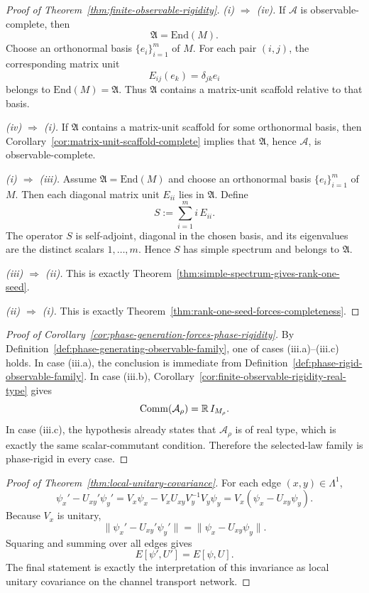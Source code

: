 \begin{proof}[Proof of Theorem~\ref{thm:finite-observable-rigidity}]
\label{proof:thm:finite-observable-rigidity}
\textit{(i) $\Rightarrow$ (iv).}
If $\mathcal A$ is observable-complete, then
\[
\mathfrak A=\mathrm{End}(M).
\]
Choose an orthonormal basis $\{e_i\}_{i=1}^m$ of $M$. For each pair $(i,j)$,
the corresponding matrix unit
\[
E_{ij}(e_k)=\delta_{jk}e_i
\]
belongs to $\mathrm{End}(M)=\mathfrak A$. Thus $\mathfrak A$ contains a
matrix-unit scaffold relative to that basis.

\smallskip\noindent
\textit{(iv) $\Rightarrow$ (i).}
If $\mathfrak A$ contains a matrix-unit scaffold for some orthonormal basis,
then Corollary~\ref{cor:matrix-unit-scaffold-complete} implies that
$\mathfrak A$, hence $\mathcal A$, is observable-complete.

\smallskip\noindent
\textit{(i) $\Rightarrow$ (iii).}
Assume $\mathfrak A=\mathrm{End}(M)$ and choose an orthonormal basis
$\{e_i\}_{i=1}^m$ of $M$. Then each diagonal matrix unit $E_{ii}$ lies in
$\mathfrak A$. Define
\[
S:=\sum_{i=1}^m i\,E_{ii}.
\]
The operator $S$ is self-adjoint, diagonal in the chosen basis, and its
eigenvalues are the distinct scalars $1,\dots,m$. Hence $S$ has simple
spectrum and belongs to $\mathfrak A$.

\smallskip\noindent
\textit{(iii) $\Rightarrow$ (ii).}
This is exactly Theorem~\ref{thm:simple-spectrum-gives-rank-one-seed}.

\smallskip\noindent
\textit{(ii) $\Rightarrow$ (i).}
This is exactly Theorem~\ref{thm:rank-one-seed-forces-completeness}.
\end{proof}

\begin{proof}[Proof of Corollary~\ref{cor:phase-generation-forces-phase-rigidity}]
\label{proof:cor:phase-generation-forces-phase-rigidity}
By Definition~\ref{def:phase-generating-observable-family}, one of cases
(iii.a)--(iii.c) holds. In case (iii.a), the conclusion is immediate from
Definition~\ref{def:phase-rigid-observable-family}. In case (iii.b),
Corollary~\ref{cor:finite-observable-rigidity-real-type} gives
\[
\mathrm{Comm}(\mathcal A_{\rho})=\mathbb{R}\,I_{M_{\rho}}.
\]
In case (iii.c), the hypothesis already states that $\mathcal A_{\rho}$ is of
real type, which is exactly the same scalar-commutant condition. Therefore the
selected-law family is phase-rigid in every case.
\end{proof}

\begin{proof}[Proof of Theorem~\ref{thm:local-unitary-covariance}]
\label{proof:thm:local-unitary-covariance}
For each edge $(x,y)\in\Lambda^1$,
\[
\psi_x' - U_{xy}'\psi_y'
=
V_x\psi_x - V_xU_{xy}V_y^{-1}V_y\psi_y
=
V_x(\psi_x-U_{xy}\psi_y).
\]
Because $V_x$ is unitary,
\[
\|\psi_x' - U_{xy}'\psi_y'\|
=
\|\psi_x-U_{xy}\psi_y\|.
\]
Squaring and summing over all edges gives
\[
E[\psi',U']=E[\psi,U].
\]
The final statement is exactly the interpretation of this invariance as local
unitary covariance on the channel transport network.
\end{proof}

